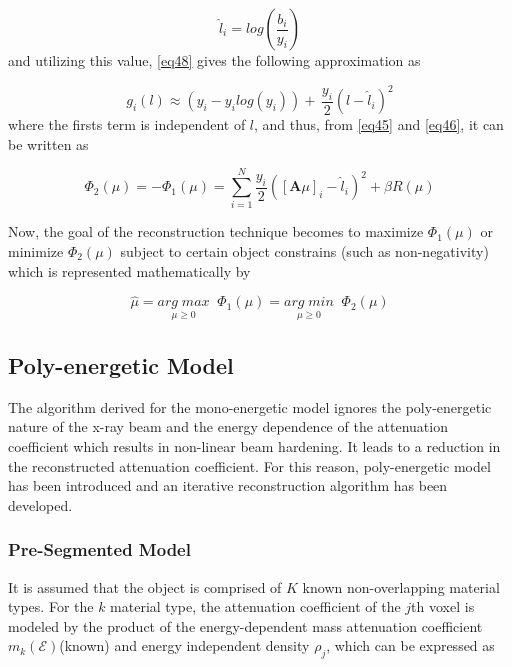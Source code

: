 \begin{equation}
\label{eq49}
\widehat{l}_i =  log\left( \frac{b_i}{y_i} \right)
\end{equation} and utilizing this value, \ref{eq48} gives the following approximation as

\begin{equation}
\label{eq50}
g_i(l) \approx \left( y_i - y_i log (y_i) \right) + \,\frac{y_i}{2}(l-\widehat{l}_i)^2
\end{equation} where the firsts term is independent of $l$, and thus, from \ref{eq45} and \ref{eq46}, it can be written as

\begin{equation}
\label{eq51}
\Phi_2(\mu) = - \Phi_1(\mu) = \sum\limits_{i=1}^N \frac{y_i}{2} \left( \left[ \textbf{A}\mu \right]_i - \widehat{l}_i \right)^2 + \beta R(\mu) 
\end{equation}

Now, the goal of the reconstruction technique becomes to maximize $\Phi_1(\mu)$ or minimize $\Phi_2(\mu)$ subject to certain object constrains (such as non-negativity) which is represented mathematically by 

\begin{equation}
\label{eq52}
\widehat{\mu} = \underset{\mu \geqslant 0 }{arg \; max} \; \; \Phi_1(\mu) = \underset{\mu \geqslant 0 }{arg \; min} \; \; \Phi_2(\mu)
\end{equation}

\subsection{Poly-energetic Model}

The algorithm derived for the mono-energetic model ignores the poly-energetic nature of the x-ray beam and the energy dependence of the attenuation coefficient which results in non-linear beam hardening. It leads to a reduction in the reconstructed attenuation coefficient. For this reason, poly-energetic model has been introduced and an iterative reconstruction algorithm has been developed.

\subsubsection{Pre-Segmented Model}

It is assumed that the object is comprised of $K$ known non-overlapping material types. For the $k$ material type, the attenuation coefficient of the $j$th voxel is modeled by the product of the energy-dependent mass attenuation coefficient $m_k(\mathcal{E})$(known) and energy independent density $\rho_j$, which can be expressed as

